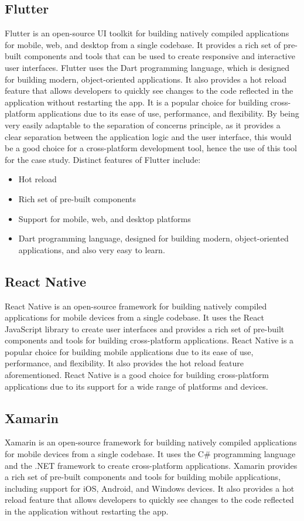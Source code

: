 \subsection{Flutter}
Flutter is an open-source UI toolkit for building natively compiled applications for mobile, web, and desktop from a single codebase.
It provides a rich set of pre-built components and tools that can be used to create responsive and interactive user interfaces.
Flutter uses the Dart programming language, which is designed for building modern, object-oriented applications.
It also provides a hot reload feature that allows developers to quickly see changes to the code reflected in the application without restarting the app.
It is a popular choice for building cross-platform applications due to its ease of use, performance, and flexibility.
By being very easily adaptable to the separation of concerns principle, as it provides a clear separation between the application logic and the user interface, this would be a good choice for a cross-platform development tool, hence the use of this tool for the case study.
Distinct features of Flutter include:
\begin{itemize}
    \item Hot reload
    \item Rich set of pre-built components
    \item Support for mobile, web, and desktop platforms
    \item Dart programming language, designed for building modern, object-oriented applications, and also very easy to learn.
\end{itemize}

\subsection{React Native}
React Native is an open-source framework for building natively compiled applications for mobile devices from a single codebase.
It uses the React JavaScript library to create user interfaces and provides a rich set of pre-built components and tools for building cross-platform applications.
React Native is a popular choice for building mobile applications due to its ease of use, performance, and flexibility.
It also provides the hot reload feature aforementioned. 
React Native is a good choice for building cross-platform applications due to its support for a wide range of platforms and devices.

\subsection{Xamarin}
Xamarin is an open-source framework for building natively compiled applications for mobile devices from a single codebase.
It uses the C\# programming language and the .NET framework to create cross-platform applications.
Xamarin provides a rich set of pre-built components and tools for building mobile applications, including support for iOS, Android, and Windows devices.
It also provides a hot reload feature that allows developers to quickly see changes to the code reflected in the application without restarting the app.


\label{chap:ch4}
